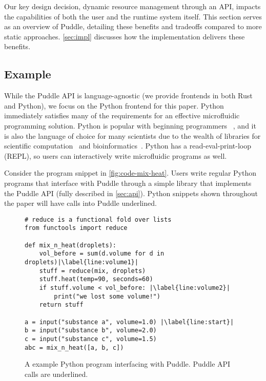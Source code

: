 \documentclass{jpaper}
\newcommand\mw[1]{\todo[color=blue!20]{\sf #1}}
\begin{document}
Our key design decision, dynamic resource management through an API, impacts the capabilities of both the user and the runtime system itself.
This section serves as an overview of Puddle, detailing these benefits and tradeoffs compared to more static approaches.
\autoref{sec:impl} discusses how the implementation delivers these benefits.

\subsection{Example}

While the Puddle API is language-agnostic (we provide frontends in both Rust and Python), we focus on the Python frontend for this paper.
Python immediately satisfies many of the requirements for an effective microfluidic programming solution.
Python is popular with beginning programmers ~\cite{python-intro}, and it is also the language of choice for many scientists due to the wealth of libraries for scientific computation~\cite{scipy} and bioinformatics~\cite{biopython}.
Python has a read-eval-print-loop (REPL), so users can interactively write microfluidic programs as well.

Consider the program snippet in \autoref{fig:code-mix-heat}.
Users write regular Python programs that interface with Puddle through a simple library that implements the Puddle API (fully described in \autoref{sec:api}).
Python snippets shown throughout the paper will have calls into Puddle underlined.

\begin{figure}
  \centering
\begin{lstlisting}[deletekeywords={temperature}, basicstyle=\footnotesize\ttfamily]
# reduce is a functional fold over lists
from functools import reduce

def mix_n_heat(droplets):
    vol_before = sum(d.volume for d in droplets)|\label{line:volume1}|
    stuff = reduce(mix, droplets)
    stuff.heat(temp=90, seconds=60)
    if stuff.volume < vol_before: |\label{line:volume2}|
        print("we lost some volume!")
    return stuff

a = input("substance a", volume=1.0) |\label{line:start}|
b = input("substance b", volume=2.0)
c = input("substance c", volume=1.5)
abc = mix_n_heat([a, b, c])
\end{lstlisting}

  \caption{
    A example Python program interfacing with Puddle.
    Puddle API calls are underlined.
  }
  \label{fig:code-mix-heat}
\end{figure}
\end{document}
